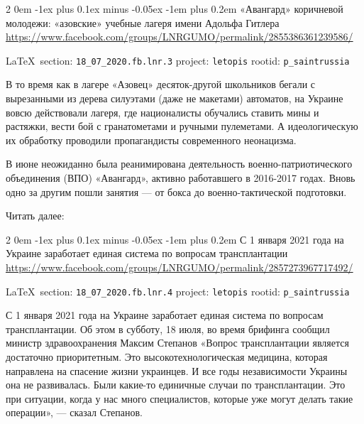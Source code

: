 \documentclass[a4paper,11pt]{extreport}
\makeatletter
\renewcommand\subsection{%
  \clearpage
    \@startsection{subsection}%
    {2}%
    {0em}%
    {-1ex plus 0.1ex minus -0.05ex}%
    {-1em plus 0.2em}%
    {\scshape\bfseries\Large}%
}
\makeatother
\begin{document}
\subsection{«Авангард» коричневой молодежи: «азовские» учебные лагеря имени Адольфа Гитлера}
\label{sec:18_07_2020.fb.lnr.3}
\url{https://www.facebook.com/groups/LNRGUMO/permalink/2855386361239586/}
  
\vspace{0.5cm}
{\small\LaTeX~section: \verb|18_07_2020.fb.lnr.3| project: \verb|letopis| rootid: \verb|p_saintrussia|}
\vspace{0.5cm}
 
В то время как в лагере «Азовец» десяток-другой школьников бегали с вырезанными
из дерева силуэтами (даже не макетами) автоматов, на Украине вовсю действовали
лагеря, где националисты обучались ставить мины и растяжки, вести бой с
гранатометами и ручными пулеметами.  А идеологическую их обработку проводили
пропагандисты современного неонацизма.

В июне неожиданно была реанимирована деятельность военно-патриотического
объединения (ВПО) «Авангард», активно работавшего в 2016-2017 годах.  Вновь
одно за другим пошли занятия --- от бокса до военно-тактической подготовки.

Читать далее: 
 
 
\subsection{С 1 января 2021 года на Украине заработает единая система по вопросам
трансплантации}
\url{https://www.facebook.com/groups/LNRGUMO/permalink/2857273967717492/}
  
\vspace{0.5cm}
{\small\LaTeX~section: \verb|18_07_2020.fb.lnr.4| project: \verb|letopis| rootid: \verb|p_saintrussia|}
\vspace{0.5cm}

С 1 января 2021 года на Украине заработает единая система по вопросам
трансплантации. Об этом в субботу, 18 июля, во время брифинга сообщил министр
здравоохранения Максим Степанов «Вопрос трансплантации является достаточно
приоритетным. Это высокотехнологическая медицина, которая направлена на
спасение жизни украинцев. И все годы независимости Украины она не развивалась.
Были какие-то единичные случаи по трансплантации. Это при ситуации, когда у нас
много специалистов, которые уже могут делать такие операции», --- сказал
Степанов.  
 
\end{document}
